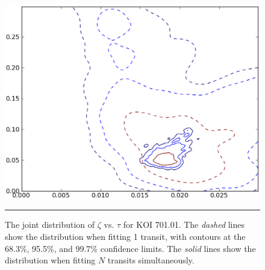 \begin{figure}[t] 
  \begin{minipage}[c]{0.47\textwidth}
    \includegraphics[width=\textwidth]{figures/joint.eps}
  \end{minipage}\hfill
  \begin{minipage}[c]{0.5\textwidth}
    \caption{The joint distribution of $\zeta$ vs. $\tau$ for KOI
      701.01.  The {\it dashed} lines show the distribution when
      fitting 1 transit, with contours at the 68.3\%, 95.5\%, and
      99.7\% confidence limits.  The {\it solid} lines show the
      distribution when fitting $N$ transits simultaneously.}
    \label{fig-joint}
    \hspace*{\fill}  
    \hrule
  \end{minipage}
\end{figure}


